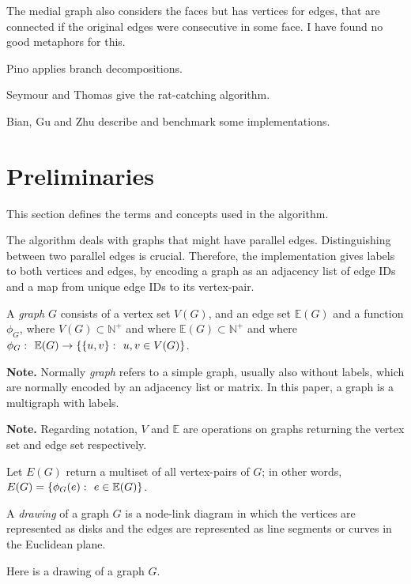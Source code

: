 \documentclass{article}
\begin{document}
	The medial graph also considers the faces but has vertices for edges, that are connected if the original edges were consecutive in some face. I have found no good metaphors for this.

	Pino\cite{Pin16} applies branch decompositions.

	Seymour and Thomas\cite{ST93} give the rat-catching algorithm.

	Bian, Gu and Zhu\cite{BGZ15} describe and benchmark some implementations.


\section{Preliminaries}

	This section defines the terms and concepts used in the algorithm.

	The algorithm deals with graphs that might have parallel edges. Distinguishing between two parallel edges is crucial. Therefore, the implementation gives labels to both vertices and edges, by encoding a graph as an adjacency list of edge IDs and a map from unique edge IDs to its vertex-pair.

	A \textit{graph} $G$ consists of a vertex set $V(G)$, and an edge set $\mathbb{E}(G)$ and a function $\phi_G$, where $V(G) \subset \mathbb{N}^+$ and where $\mathbb{E}(G) \subset \mathbb{N}^+$ and where $\phi_G \,\colon\  \mathbb{E}(G) \to \{\{u,v\} \,\colon\  u,v \in V(G)\}$.

	\textbf{Note.} Normally \textit{graph} refers to a simple graph, usually also without labels, which are normally encoded by an adjacency list or matrix. In this paper, a graph is a multigraph with labels.

	\textbf{Note.} Regarding notation, $V$ and $\mathbb{E}$ are operations on graphs returning the vertex set and edge set respectively.

	Let $E(G)$ return a multiset of all vertex-pairs of $G$; in other words, $E(G) = \{\phi_G(e) \,\colon\  e \in \mathbb{E}(G)\}$.

	A \textit{drawing} of a graph $G$ is a node-link diagram in which the vertices are represented as disks and the edges are represented as line segments or curves in the Euclidean plane.

	Here is a drawing of a graph $G$.

	\begin{center}
		
	\end{center}
\end{document}
